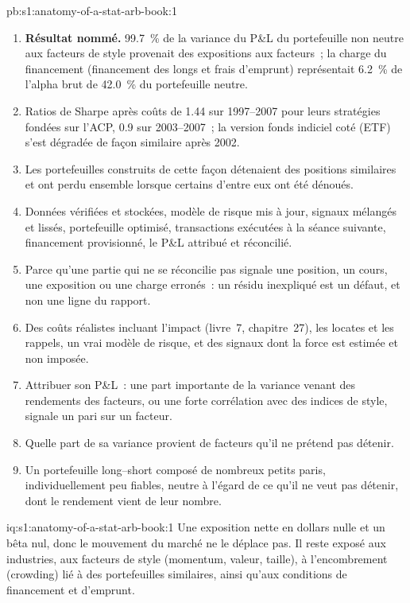\begin{solution}{pb:s1:anatomy-of-a-stat-arb-book:1}
\begin{enumerate}
\item \textbf{Résultat nommé.} 99.7~\% de la variance du P\&L du portefeuille non neutre aux facteurs de style provenait des expositions aux facteurs~; la charge du financement (financement des longs et
frais d'emprunt) représentait 6.2~\% de l'alpha brut de 42.0~\% du portefeuille neutre.
\item Ratios de Sharpe après coûts de 1.44 sur 1997--2007 pour leurs stratégies fondées sur l'ACP, 0.9 sur 2003--2007~; la version fonds indiciel coté (ETF) s'est dégradée de façon similaire après 2002.
\item Les portefeuilles construits de cette façon détenaient des positions similaires et ont perdu ensemble lorsque certains d'entre eux ont été dénoués.
\item Données vérifiées et stockées, modèle de risque mis à jour, signaux mélangés et lissés, portefeuille optimisé, transactions exécutées à la séance suivante, financement provisionné, le P\&L
attribué et réconcilié.
\item Parce qu'une partie qui ne se réconcilie pas signale une position, un cours, une exposition ou une charge erronés~: un résidu inexpliqué est un défaut, et non une ligne du rapport.
\item Des coûts réalistes incluant l'impact (livre~7, chapitre~27), les locates et les rappels, un vrai modèle de risque, et des signaux dont la force est estimée et non imposée.
\item Attribuer son P\&L~: une part importante de la variance venant des rendements des facteurs, ou une forte corrélation avec des indices de style, signale un pari sur un facteur.
\item Quelle part de sa variance provient de facteurs qu'il ne prétend pas détenir.
\item Un portefeuille long--short composé de nombreux petits paris, individuellement peu fiables, neutre à l'égard de ce qu'il ne veut pas détenir, dont le rendement vient de leur nombre.
\end{enumerate}
\end{solution}

\begin{solution}{iq:s1:anatomy-of-a-stat-arb-book:1}
Une exposition nette en dollars nulle et un bêta nul, donc le mouvement du marché ne le déplace pas. Il reste exposé aux industries, aux facteurs de style (momentum, valeur, taille), à l'encombrement (crowding) lié à des portefeuilles
similaires, ainsi qu'aux conditions de financement et d'emprunt.
\end{solution}

